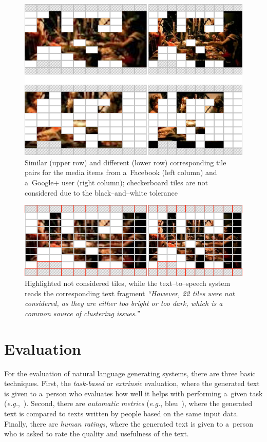 \documentclass{article}
\begin{document}
\begin{figure}[t!]
  \centering
  \includegraphics[width=0.75\linewidth]{./similar-different.png}
  \caption{Similar (upper row) and different (lower row) corresponding tile pairs for the media items from a~Facebook (left column) and a~Google+ user (right column); checkerboard tiles are not considered due to the black--and--white tolerance}
  \label{fig:similar-different}
\end{figure}

\begin{figure}[t!]
  \centering
  \includegraphics[width=0.75\linewidth]{./tile-highlight.png}
  \caption{Highlighted not considered tiles,
    while the text--to--speech system reads the corresponding text fragment
    \textit{``However, 22 tiles were not considered,
    as they are either too bright or too dark,
    which is a common source of clustering issues.''}}
  \label{fig:tile-highlight}
\end{figure}

\section{Evaluation}
\label{sec:evaluation}

For the evaluation of natural language generating systems,
there are three basic techniques.
First, the \emph{task-based} or \emph{extrinsic} evaluation,
where the generated text is given to a~person
who evaluates how well it helps with performing a~given task
(\emph{e.g.},~\cite{portet2009nlg}).
Second, there are \emph{automatic metrics}
(\emph{e.g.}, {\sc bleu}~\cite{papineni2002bleu}),
where the generated text is compared to texts written by people
based on the same input data.
Finally, there are \emph{human ratings}, where the generated text
is given to a~person who is asked to rate
the quality and usefulness of the text.
\end{document}
